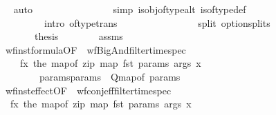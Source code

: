 \begin{isabellebody}
\ \ \ \ \ \ \ \ \isamarkupfalse%
\ {\isacharparenleft}{\kern0pt}auto\isanewline
\ \ \ \ \ \ \ \ \ \ \ \ \ \ \ \ simp{\isacharcolon}{\kern0pt}\ is{\isacharunderscore}{\kern0pt}obj{\isacharunderscore}{\kern0pt}of{\isacharunderscore}{\kern0pt}type{\isacharunderscore}{\kern0pt}alt\ is{\isacharunderscore}{\kern0pt}of{\isacharunderscore}{\kern0pt}type{\isacharunderscore}{\kern0pt}def\isanewline
\ \ \ \ \ \ \ \ \ \ \ \ \ \ \ \ intro{\isacharcolon}{\kern0pt}\ of{\isacharunderscore}{\kern0pt}type{\isacharunderscore}{\kern0pt}trans\isanewline
\ \ \ \ \ \ \ \ \ \ \ \ \ \ \ \ split{\isacharcolon}{\kern0pt}\ option{\isachardot}{\kern0pt}splits{\isacharparenright}{\kern0pt}\isanewline
\ \ \ \ \ \ \ \ \isamarkupfalse%
\isanewline
\ \ \ \ \ \ \isamarkupfalse%
\isanewline
\ \ \ \ \isamarkupfalse%
\ \isamarkupfalse%
\ {\isacharquery}{\kern0pt}thesis\isanewline
\ \ \ \ \ \ \isamarkupfalse%
\ assms\isanewline
\ \ \ \ \ \ \ \ wf{\isacharunderscore}{\kern0pt}inst{\isacharunderscore}{\kern0pt}formula{\isacharbrackleft}{\kern0pt}OF\ {\isacharunderscore}{\kern0pt}\ wf{\isacharunderscore}{\kern0pt}BigAnd{\isacharunderscore}{\kern0pt}filter{\isacharunderscore}{\kern0pt}time{\isacharunderscore}{\kern0pt}spec{\isacharcomma}{\kern0pt}\ \isanewline
\ \ \ \ \ \ \ \ \ \ \ f{}{\isacharequal}{\kern0pt}{\isachardoublequoteopen}{\isasymlambda}x{\isachardot}{\kern0pt}\ the\ {\isacharparenleft}{\kern0pt}map{\isacharunderscore}{\kern0pt}of\ {\isacharparenleft}{\kern0pt}zip\ {\isacharparenleft}{\kern0pt}map\ fst\ params{\isacharparenright}{\kern0pt}\ args{\isacharparenright}{\kern0pt}\ x{\isacharparenright}{\kern0pt}{\isachardoublequoteclose}\ \isanewline
\ \ \ \ \ \ \ \ \ \ \ \ \ \ \ params{}{\isacharequal}{\kern0pt}{\isachardoublequoteopen}params{\isachardoublequoteclose}\ \ Q{}{\isacharequal}{\kern0pt}{\isachardoublequoteopen}{\isacharparenleft}{\kern0pt}map{\isacharunderscore}{\kern0pt}of\ params{\isacharparenright}{\kern0pt}{\isachardoublequoteclose}{\isacharbrackright}{\kern0pt}\isanewline
\ \ \ \ \ \ \ \ wf{\isacharunderscore}{\kern0pt}inst{\isacharunderscore}{\kern0pt}effect{\isacharbrackleft}{\kern0pt}OF\ {\isacharunderscore}{\kern0pt}\ wf{\isacharunderscore}{\kern0pt}conj{\isacharunderscore}{\kern0pt}eff{\isacharunderscore}{\kern0pt}filter{\isacharunderscore}{\kern0pt}time{\isacharunderscore}{\kern0pt}spec{\isacharcomma}{\kern0pt}\ \isanewline
\ \ \ \ \ \ \ \ \ f{}{\isacharequal}{\kern0pt}{\isachardoublequoteopen}{\isasymlambda}x{\isachardot}{\kern0pt}\ the\ {\isacharparenleft}{\kern0pt}map{\isacharunderscore}{\kern0pt}of\ {\isacharparenleft}{\kern0pt}zip\ {\isacharparenleft}{\kern0pt}map\ fst\ params{\isacharparenright}{\kern0pt}\ args{\isacharparenright}{\kern0pt}\ x{\isacharparenright}{\kern0pt}{\isachardoublequoteclose}\ \isanewline

\end{isabellebody}
